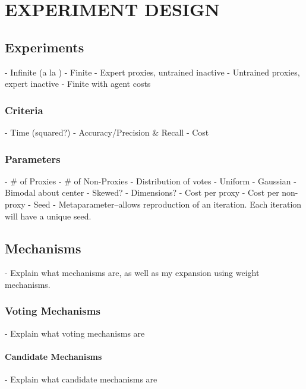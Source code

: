 %
%

\chapter{EXPERIMENT DESIGN}\label{ch:experiment-design}



\section{Experiments}\label{sec:experiments}
- Infinite (a la \cite{Cohensius2017})
- Finite
- Expert proxies, untrained inactive
- Untrained proxies, expert inactive
- Finite with agent costs

\subsection{Criteria}\label{subsec:criteria}
- Time (squared?)
- Accuracy/Precision \& Recall
- Cost

\subsection{Parameters}\label{subsec:parameters}
- \# of Proxies
- \# of Non-Proxies
- Distribution of votes
    - Uniform
    - Gaussian
    - Bimodal about center
    - Skewed?
- Dimensions?
- Cost per proxy
- Cost per non-proxy
- Seed
    - Metaparameter--allows reproduction of an iteration. Each iteration
      will have a unique seed.

\section{Mechanisms}\label{sec:mechanisms}
- Explain what mechanisms are, as well as my expansion using weight mechanisms.

\subsection{Voting Mechanisms}\label{subsec:voting-mechanisms}
- Explain what voting mechanisms are

\subsubsection{Candidate Mechanisms}\label{subsubsec:candidate-mechanisms}
- Explain what candidate mechanisms are

